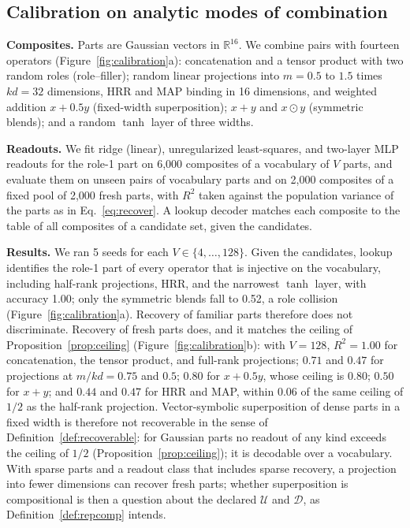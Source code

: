 \documentclass[10pt]{article}
\theoremstyle{plain}
\theoremstyle{remark}
\newcommand{\R}{\mathbb{R}}
\newcommand{\U}{\mathcal{U}}
\newcommand{\D}{\mathcal{D}}
\begin{document}
\subsection{Calibration on analytic modes of combination}
\label{sec:calibration}

\textbf{Composites.} Parts are Gaussian vectors in $\R^{16}$. We combine pairs with fourteen operators (Figure~\ref{fig:calibration}a): concatenation and a tensor product with two random roles (role--filler); random linear projections into $m = 0.5$ to $1.5$ times $kd = 32$ dimensions, HRR and MAP binding in 16 dimensions, and weighted addition $x + 0.5y$ (fixed-width superposition); $x + y$ and $x \odot y$ (symmetric blends); and a random $\tanh$ layer of three widths.

\textbf{Readouts.} We fit ridge (linear), unregularized least-squares, and two-layer MLP readouts for the role-1 part on 6{,}000 composites of a vocabulary of $V$ parts, and evaluate them on unseen pairs of vocabulary parts and on 2{,}000 composites of a fixed pool of 2{,}000 fresh parts, with $R^2$ taken against the population variance of the parts as in Eq.~\eqref{eq:recover}. A lookup decoder matches each composite to the table of all composites of a candidate set, given the candidates.

\textbf{Results.} We ran 5 seeds for each $V \in \{4, \ldots, 128\}$. Given the candidates, lookup identifies the role-1 part of every operator that is injective on the vocabulary, including half-rank projections, HRR, and the narrowest $\tanh$ layer, with accuracy 1.00; only the symmetric blends fall to 0.52, a role collision (Figure~\ref{fig:calibration}a). Recovery of familiar parts therefore does not discriminate. Recovery of fresh parts does, and it matches the ceiling of Proposition~\ref{prop:ceiling} (Figure~\ref{fig:calibration}b): with $V = 128$, $R^2 = 1.00$ for concatenation, the tensor product, and full-rank projections; $0.71$ and $0.47$ for projections at $m/kd = 0.75$ and $0.5$; $0.80$ for $x + 0.5y$, whose ceiling is $0.80$; $0.50$ for $x + y$; and $0.44$ and $0.47$ for HRR and MAP, within 0.06 of the same ceiling of $1/2$ as the half-rank projection. Vector-symbolic superposition of dense parts in a fixed width is therefore not recoverable in the sense of Definition~\ref{def:recoverable}: for Gaussian parts no readout of any kind exceeds the ceiling of $1/2$ (Proposition~\ref{prop:ceiling}); it is decodable over a vocabulary. With sparse parts and a readout class that includes sparse recovery, a projection into fewer dimensions can recover fresh parts; whether superposition is compositional is then a question about the declared $\U$ and $\D$, as Definition~\ref{def:repcomp} intends.
\end{document}

